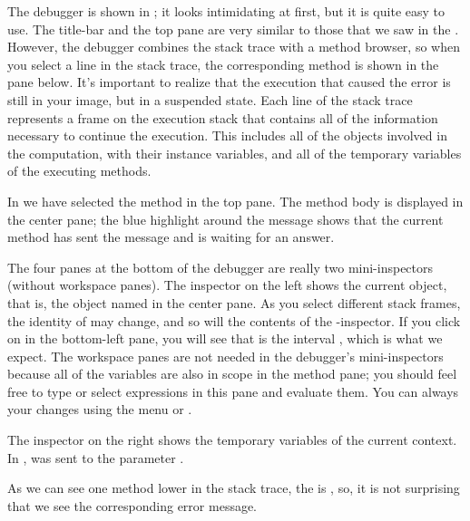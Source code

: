 \documentclass[a4paper,10pt,twoside]{book}
\begin{document}
The debugger is shown in ; it looks intimidating at first, but it is quite easy to use.
The title-bar and the top pane are very similar to those that we saw in the .  
However, the debugger combines the stack trace with a method browser, so when you select a line in the stack trace, the corresponding method is shown in the pane below.
It's important to realize that the execution that caused the error is still in your image, but in a suspended state.  
Each line of the stack trace represents a frame on the execution stack that contains all of the information necessary to continue the execution.  This includes all of the objects involved in the computation, with their instance variables, and all of the temporary variables of the executing methods.

In  we have selected the  method in the top pane.
The method body is displayed in the center pane; the blue highlight around the message  shows that the current method has sent the message  and is waiting for an answer.

The four panes at the bottom of the debugger are really two mini-inspectors (without workspace panes).
The inspector on the left shows the current object, that is, the object named \self in the center pane.
As you select different stack frames, the identity of \self may change, and so will the contents of the 
\self{}-inspector.
If you click on \self in the bottom-left pane, you will see that \self is the interval , which is what we expect.
The workspace panes are not needed in the debugger's mini-inspectors because all of the variables are also in scope in the method pane; you should feel free to type or select expressions in this pane and evaluate them.  
You can always  your changes using the menu or . 

The inspector on the right shows the temporary variables of the current context.
In ,
 was sent to the parameter .


As we can see one method lower in the stack trace, the  is , so, it is not surprising that we see the corresponding error message.
\end{document}
